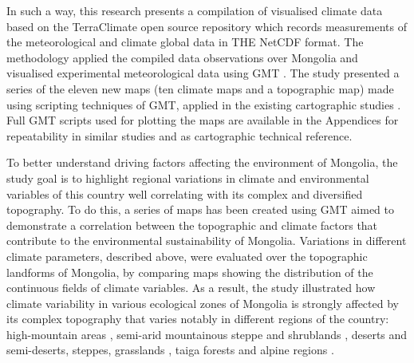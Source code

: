 \documentclass[geosciences,article,submit,pdftex,moreauthors]{Definitions/mdpi}
\begin{document}
In such a way, this research presents a compilation of visualised climate data based on the TerraClimate open source repository which records measurements of the meteorological and climate global data in THE NetCDF format. The methodology applied the compiled data observations over Mongolia and visualised experimental meteorological data using GMT \cite{Wesseletal2019}. The study presented a series of the eleven new maps (ten climate maps and a topographic map) made using scripting techniques of GMT, applied in the existing cartographic studies \cite{Lemenkova2019a,Kasalica,Lemenkova2021d,Spinellis,Lemenkova2021e,Virden}. Full GMT scripts used for plotting the maps are available in the Appendices for repeatability in similar studies and as cartographic technical reference.  

To better understand driving factors affecting the environment of Mongolia, the study goal is to highlight regional variations in climate and environmental variables of this country well correlating with its complex and diversified topography. To do this, a series of maps has been created using GMT aimed to demonstrate a correlation between the topographic and climate factors that contribute to the environmental sustainability of Mongolia. Variations in different climate parameters, described above, were evaluated over the topographic landforms of Mongolia, by comparing maps showing the distribution of the continuous fields of climate variables. As a result, the study illustrated how climate variability in various ecological zones of Mongolia is strongly affected by its complex topography that varies notably in different regions of the country: high-mountain areas \cite{UNKELBACH2021100073,UNKELBACH2021107076}, semi-arid mountainous steppe and shrublands \cite{Minderlein}, deserts and semi-deserts, steppes, grasslands \cite{WANG2022108783,LIU2021108567}, taiga forests \cite{GRADEL201724,DULAMSUREN2005376} and alpine regions \cite{KLINGE2022108113}. 
\end{document}
